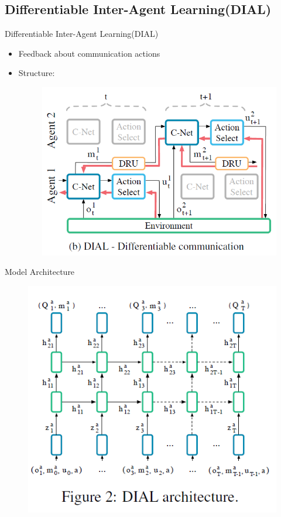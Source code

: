 \documentclass[mathserif]{beamer}
\begin{document}
\subsection{Differentiable Inter-Agent Learning(DIAL)}
\begin{frame}{Differentiable Inter-Agent Learning(DIAL)}
  \begin{itemize}
    \item Feedback about communication actions
    \item Structure:
    \begin{figure}
      \centering
      \includegraphics[scale=0.6]{fig/2}
    \end{figure}
  \end{itemize}
\end{frame}

\begin{frame}{Model Architecture}
  \begin{figure}
    \centering
    \includegraphics[scale=1]{fig/3}
  \end{figure}
\end{frame}
\end{document}

